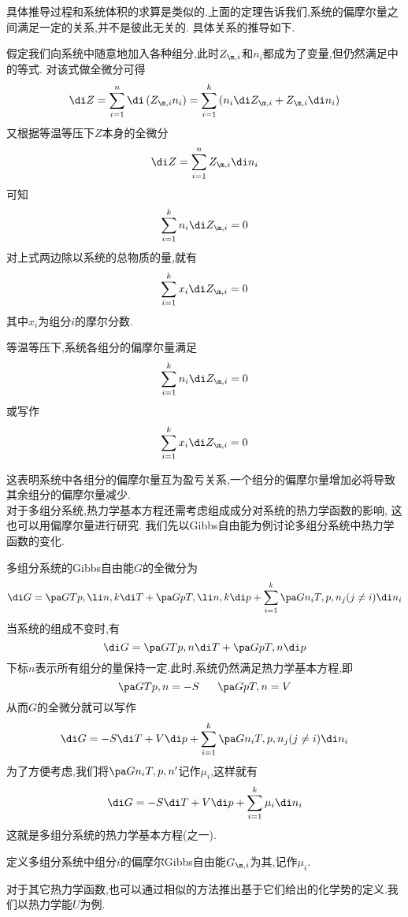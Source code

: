 \documentclass{ctexart}
\begin{document}
具体推导过程和系统体积的求算是类似的.上面的定理告诉我们,系统的偏摩尔量之间满足一定的关系,并不是彼此无关的.%
具体关系的推导如下.
\begin{derivation}
    假定我们向系统中随意地加入各种组分,此时$Z_{\m,i}$和$n_i$都成为了变量,但仍然满足中的等式.%
    对该式做全微分可得
    \[\di Z=\sum_{i=1}^{n}\di\left(Z_{\m,i}n_i\right)=\sum_{i=1}^k\left(n_i\di Z_{\m,i}+Z_{\m,i}\di n_i\right)\]
    又根据等温等压下$Z$本身的全微分
    \[\di Z=\sum_{i=1}^{n}Z_{\m,i}\di n_i\]
    可知
    \[\sum_{i=1}^{k}n_i\di Z_{\m,i}=0\]
    对上式两边除以系统的总物质的量,就有
    \[\sum_{i=1}^kx_i\di Z_{\m,i}=0\]
    其中$x_i$为组分$i$的摩尔分数.
\end{derivation}
\begin{theorem}
    等温等压下,系统各组分的偏摩尔量满足
    \[\sum_{i=1}^kn_i\di Z_{\m,i}=0\]
    或写作
    \[\sum_{i=1}^kx_i\di Z_{\m,i}=0\]

\end{theorem}
这表明系统中各组分的偏摩尔量互为盈亏关系,一个组分的偏摩尔量增加必将导致其余组分的偏摩尔量减少.\vspace{12pt}\\
\indent 对于多组分系统,热力学基本方程还需考虑组成成分对系统的热力学函数的影响,%
这也可以用偏摩尔量进行研究.%
我们先以Gibbs自由能为例讨论多组分系统中热力学函数的变化.
\begin{derivation}
    多组分系统的Gibbs自由能$G$的全微分为
    \[\di G=\pa GT{p,\li n,k}\di T+\pa Gp{T,\li n,k}\di p+\sum_{i=1}^{k}\pa G{n_i}{T,p,n_{j}(j\neq i)}\di n_i\]
    当系统的组成不变时,有
    \[\di G=\pa GT{p,n}\di T+\pa Gp{T,n}\di p\]
    下标$n$表示所有组分的量保持一定.此时,系统仍然满足热力学基本方程,即
    \[\pa GT{p,n}=-S\ \ \ \ \ \pa Gp{T,n}=V\]
    从而$G$的全微分就可以写作
    \[\di G=-S\di T+V\di p+\sum_{i=1}^{k}\pa G{n_i}{T,p,n_{j}(j\neq i)}\di n_i\]
    为了方便考虑,我们将$\pa G{n_i}{T,p,n'}$记作$\mu_i$,这样就有
    \[\di G=-S\di T+V\di p+\sum_{i=1}^k\mu_i\di n_i\]
    这就是多组分系统的热力学基本方程(之一).
\end{derivation}
\begin{definition}[4B.3.1 偏摩尔Gibbs自由能与化学势]
    定义多组分系统中组分$i$的偏摩尔Gibbs自由能$G_{\m,i}$为其,记作$\mu_i$.
\end{definition}
对于其它热力学函数,也可以通过相似的方法推出基于它们给出的化学势的定义.我们以热力学能$U$为例.
\end{document}
